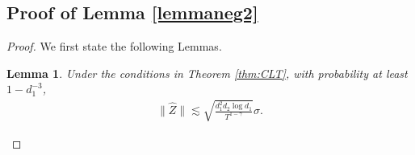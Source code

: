 \documentclass[12pt]{article}
\newcommand{\red}[1]{{\color{red}#1}}
\def\EE{{\mathbb E}}
\newtheorem{Lemma}{Lemma}
\theoremstyle{plain}
\begin{document}
\subsection{Proof of Lemma \ref{lemmaneg2}}
\begin{proof}
    We first state the following Lemmas.
    \begin{Lemma}
        \label{Zbound:new}
        Under the conditions in Theorem \ref{thm:CLT}, with probability at least $1-d_1^{-3}$,
        \begin{align*}
        \|\widehat{Z}\|\lesssim \sqrt{\frac{d_1^2d_2\log d_1}{T^{1-\gamma}}}\sigma.
        \end{align*}
    \end{Lemma}

    


\end{proof}
\end{document}
